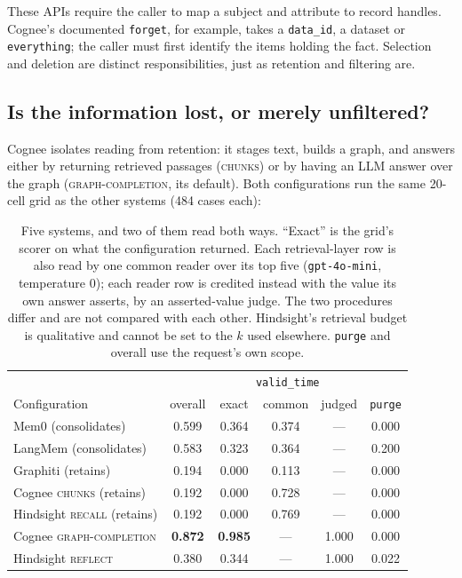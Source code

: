 \documentclass[conference]{IEEEtran}
\begin{document}
These APIs require the caller to map a subject and attribute to record
handles. Cognee's documented \texttt{forget}, for example, takes a
\texttt{data\_id}, a dataset or \texttt{everything}; the caller must first
identify the items holding the fact. Selection and deletion are distinct
responsibilities, just as retention and filtering are.

\subsection{Is the information lost, or merely unfiltered?}
\label{sec:reader}

Cognee isolates reading from retention: it stages text, builds a graph, and
answers either by
returning retrieved passages (\textsc{chunks}) or by having an LLM answer over
the graph (\textsc{graph-completion}, its default). Both configurations run the
same 20-cell grid as the other systems (484 cases each):

\begin{table}[t]
\centering
\caption{Five systems, and two of them read both ways. ``Exact'' is the grid's
scorer on what the configuration returned. Each retrieval-layer row is also read
by one common reader over its top five (\texttt{gpt-4o-mini}, temperature 0);
each reader row is credited instead with the value its own answer asserts, by an
asserted-value judge. The two procedures differ and are not compared with each
other. Hindsight's retrieval budget is qualitative and cannot be set to the $k$
used elsewhere. \texttt{purge} and overall use the request's own scope.}
\label{tab:reader}
\footnotesize
\setlength{\tabcolsep}{2.4pt}
\begin{tabular}{@{}lccccc@{}}
\toprule
 & & \multicolumn{3}{c}{\texttt{valid\_time}} & \\
Configuration & overall & exact & common & judged & \texttt{purge} \\
\midrule
Mem0 (consolidates)              & 0.599 & 0.364 & 0.374 & --- & 0.000 \\
LangMem (consolidates)           & 0.583 & 0.323 & 0.364 & --- & 0.200 \\
Graphiti (retains)               & 0.194 & 0.000 & 0.113 & --- & 0.000 \\
Cognee \textsc{chunks} (retains) & 0.192 & 0.000 & 0.728 & --- & 0.000 \\
Hindsight \textsc{recall} (retains) & 0.192 & 0.000 & 0.769 & --- & 0.000 \\
\midrule
Cognee \textsc{graph-completion} & \textbf{0.872} & \textbf{0.985} & --- & 1.000 & 0.000 \\
Hindsight \textsc{reflect}       & 0.380 & 0.344 & --- & 1.000 & 0.022 \\
\bottomrule
\end{tabular}
\end{table}
\end{document}
